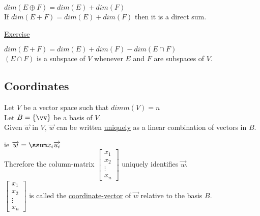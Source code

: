 \documentclass[12pt]{article}
\renewcommand{\v}[1]{\overrightarrow{#1}}
\newcommand\m[1]{\begin{bmatrix}#1\end{bmatrix}}
\newenvironment{block}[1][Label]{\underline{#1}\par}{}
\newcommand{\bb}[1]{\left\{#1\right\}}
\begin{document}
	$dim(E \oplus F) = dim(E) + dim(F)$ \\
	If $dim(E + F) = dim(E) + dim(F)$ then it is a direct sum.
	
	\begin{block}[Exercise]
		$dim(E + F) = dim(E) + dim(F) - dim(E \cap F)$ \\
		$(E \cap F)$ is a subspace of $V$ whenever $E$ and $F$ are subspaces of $V$.
	\end{block}
	
	\subsection{Coordinates}
	
	Let $V$ be a vector space such that $dimm(V) = n$ \\
	Let $B = \bb{\vv}$ be a basis of $V$. \\
	Given $\v{w}$ in $V$, $\v{w}$ can be written \underline{uniquely} as a linear combination of vectors in $B$.
	
	ie $\v{w} = \ssum x_i \v{u_i}$ \\
	
	Therefore the column-matrix $\m{x_1 \\ x_2 \\ \vdots \\ x_n}$ uniquely identifies $\v{w}$. \\
	
	$\m{x_1 \\ x_2 \\ \vdots \\ x_n}$ is called the \underline{coordinate-vector} of $\v{w}$ relative to the basis $B$.
	
\end{document}
